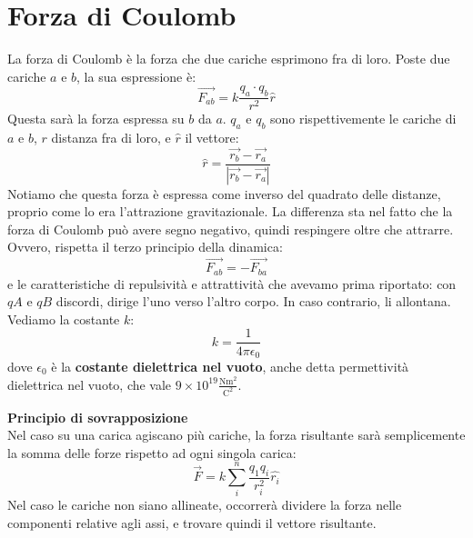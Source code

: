 \documentclass[a4paper,12pt]{article}
\begin{document}
\section{Forza di Coulomb}
La forza di Coulomb è la forza che due cariche esprimono fra di loro. Poste due cariche $a$ e $b$, 
la sua espressione è:
$$ \vec{F_{ab}} = k \frac{q_a\cdot q_b}{r^2}\hat{r}$$
Questa sarà la forza espressa su $b$ da $a$. $q_a$ e $q_b$ sono rispettivemente le cariche di $a$ e $b$, $r$ distanza
fra di loro, e $\hat{r}$ il vettore:
$$ \hat{r} = \frac{\vec{r_b} - \vec{r_a}}{|\vec{r_b} - \vec{r_a}|} $$
Notiamo che questa forza è espressa come inverso del quadrato delle distanze, proprio come lo era l'attrazione gravitazionale. La differenza
sta nel fatto che la forza di Coulomb può avere segno negativo, quindi respingere oltre che attrarre. Ovvero,
rispetta il terzo principio della dinamica:
$$ \vec{F_{ab}} = -\vec{F_{ba}} $$
e le caratteristiche di repulsività e attrattività che avevamo prima riportato: con $qA$ e $qB$ discordi, dirige 
l'uno verso l'altro corpo. In caso contrario, li allontana. Vediamo la costante $k$:
$$ k = \frac{1}{4\pi \epsilon_0} $$
dove $\epsilon_0$ è la \textbf{costante dielettrica nel vuoto}, anche detta permettività dielettrica nel vuoto, che
vale $9 \times 10^{19} \frac{\mathrm{Nm}^2}{\mathrm{C}^2}$.
\par\smallskip
\textbf{Principio di sovrapposizione} \\
Nel caso su una carica agiscano più cariche, la forza risultante sarà semplicemente la somma delle forze rispetto ad ogni singola carica:
$$ \vec{F} = k \sum_i^n\frac{q_1 q_i}{r_i^2}\hat{r_i} $$
Nel caso le cariche non siano allineate, occorrerà dividere la forza nelle componenti relative agli assi, e trovare quindi il vettore risultante.
\end{document}
